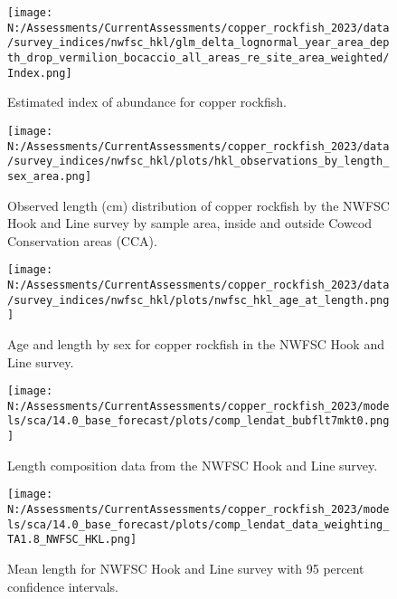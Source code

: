\documentclass[11pt,
  english,
  letterpaper,
]{article}
\begin{document}
\pagebreak

\begin{figure}
\centering
\texttt{[image: N:/Assessments/CurrentAssessments/copper\_rockfish\_2023/data/survey\_indices/nwfsc\_hkl/glm\_delta\_lognormal\_year\_area\_depth\_drop\_vermilion\_bocaccio\_all\_areas\_re\_site\_area\_weighted/Index.png]}
\caption{Estimated index of abundance for copper rockfish.\label{fig:nwfsc-hkl-index-main}}
\end{figure}

\pagebreak

\begin{figure}
\centering
\texttt{[image: N:/Assessments/CurrentAssessments/copper\_rockfish\_2023/data/survey\_indices/nwfsc\_hkl/plots/hkl\_observations\_by\_length\_sex\_area.png]}
\caption{Observed length (cm) distribution of copper rockfish by the NWFSC Hook and Line survey by sample area, inside and outside Cowcod Conservation areas (CCA).\label{fig:nwfsc-hkl-site-len}}
\end{figure}

\pagebreak

\begin{figure}
\centering
\texttt{[image: N:/Assessments/CurrentAssessments/copper\_rockfish\_2023/data/survey\_indices/nwfsc\_hkl/plots/nwfsc\_hkl\_age\_at\_length.png]}
\caption{Age and length by sex for copper rockfish in the NWFSC Hook and Line survey.\label{fig:nwfsc-hkl-len-age}}
\end{figure}

\pagebreak

\begin{figure}
\centering
\texttt{[image: N:/Assessments/CurrentAssessments/copper\_rockfish\_2023/models/sca/14.0\_base\_forecast/plots/comp\_lendat\_bubflt7mkt0.png]}
\caption{Length composition data from the NWFSC Hook and Line survey.\label{fig:hkl-len-data}}
\end{figure}

\pagebreak

\begin{figure}
\centering
\texttt{[image: N:/Assessments/CurrentAssessments/copper\_rockfish\_2023/models/sca/14.0\_base\_forecast/plots/comp\_lendat\_data\_weighting\_TA1.8\_NWFSC\_HKL.png]}
\caption{Mean length for NWFSC Hook and Line survey with 95 percent confidence intervals.\label{fig:mean-hkl-len-data}}
\end{figure}
\end{document}
